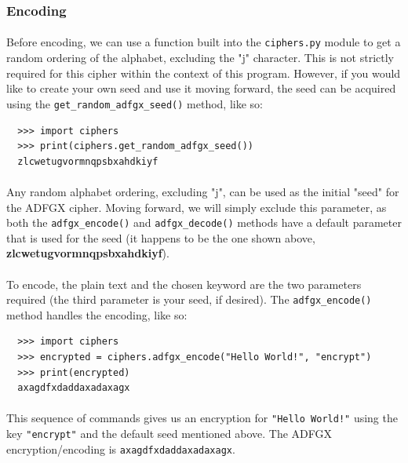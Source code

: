 \documentclass[12pt,a4paper]{article}
\begin{document}
\subsubsection{Encoding}
\paragraph{}
Before encoding, we can use a function built into the \verb|ciphers.py| module 
to get a random ordering of the alphabet, excluding the "j" character.  This is 
not strictly required for this cipher within the context of this program.  
However, if you would like to create your own seed and use it moving forward, 
the seed can be acquired using the \verb|get_random_adfgx_seed()| method, 
like so:

\begin{verbatim}
  >>> import ciphers
  >>> print(ciphers.get_random_adfgx_seed())
  zlcwetugvormnqpsbxahdkiyf
\end{verbatim}

\paragraph{}
Any random alphabet ordering, excluding "j", can be used as the initial "seed" 
for the ADFGX cipher.  Moving forward, we will simply exclude 
this parameter, as both the \verb|adfgx_encode()| and \verb|adfgx_decode()|
methods have a default parameter that is used for the seed (it happens to be 
the one shown above, \textbf{zlcwetugvormnqpsbxahdkiyf}). 

\paragraph{}
To encode, the plain text and the chosen keyword are the two parameters 
required (the third parameter is your seed, if desired).  The 
\verb|adfgx_encode()| method handles the encoding, like so:

\begin{verbatim}
  >>> import ciphers
  >>> encrypted = ciphers.adfgx_encode("Hello World!", "encrypt")
  >>> print(encrypted)
  axagdfxdaddaxadaxagx
\end{verbatim}

\paragraph{}
This sequence of commands gives us an encryption for \verb|"Hello World!"| 
using the key \verb|"encrypt"| and the default seed mentioned above.  The 
ADFGX encryption/encoding is \verb|axagdfxdaddaxadaxagx|.
\end{document}
